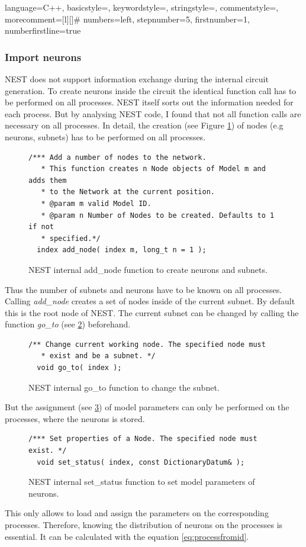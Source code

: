  {language=C++,
                basicstyle=\small\ttfamily,
                keywordstyle=\color{blue}\ttfamily,
                stringstyle=\color{red}\ttfamily,
                commentstyle=\color{green}\ttfamily,
                morecomment=[l][\color{magenta}]{\#}
                numbers=left,
  				stepnumber=5,    
  				firstnumber=1,
 				numberfirstline=true
}

\subsubsection{Import neurons}
NEST does not support information exchange during the internal circuit generation. 
To create neurons inside the circuit the identical function call has to be
performed on all processes. NEST itself sorts out the information needed for each process.
But by analysing NEST code, I found that not all function calls are necessary on all processes.
In detail, the creation (see Figure \ref{code:addnode}) of nodes (e.g neurons, subnets) has to be performed on all processes.
\begin{figure}[ht!]
\begin{lstlisting}[style=cppcode]
/*** Add a number of nodes to the network.
   * This function creates n Node objects of Model m and adds them
   * to the Network at the current position.
   * @param m valid Model ID.
   * @param n Number of Nodes to be created. Defaults to 1 if not
   * specified.*/
  index add_node( index m, long_t n = 1 );
\end{lstlisting}
\caption{NEST internal add\_{}node function to create neurons and subnets.}
\label{code:addnode}
\end{figure}
Thus the number of subnets and neurons have to be known on all processes.
Calling \emph{add\_node} creates a set of nodes inside of the current subnet.
By default this is the root node of NEST.
The current subnet can be changed by calling the function \emph{go\_to} (see \ref{code:goto}) beforehand.
\begin{figure}[ht!]
\begin{lstlisting}[style=cppcode]
/** Change current working node. The specified node must
   * exist and be a subnet. */
  void go_to( index );
\end{lstlisting}
\caption{NEST internal go\_{}to function to change the subnet.}
\label{code:goto}
\end{figure}
But the assignment (see \ref{code:setstatus}) of model parameters can only be performed on the processes,
where the neurons is stored.
\begin{figure}[ht!]
\begin{lstlisting}[style=cppcode]
/*** Set properties of a Node. The specified node must exist. */
  void set_status( index, const DictionaryDatum& );
\end{lstlisting}
\caption{NEST internal set\_{}status function to set model parameters of neurons.}
\label{code:setstatus}
\end{figure}
This only allows to load and assign the parameters on the corresponding processes.
Therefore, knowing the distribution of neurons on the processes is essential.
It can be calculated with the equation \ref{eq:processfromid}.

